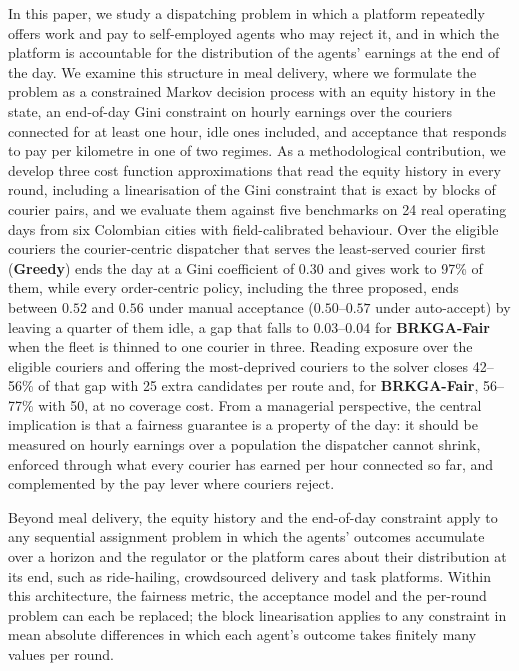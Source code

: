 \documentclass[a4paper,11pt,review,3p,authoryear]{elsarticle}
\begin{document}
In this paper, we study a dispatching problem in which a platform repeatedly offers work and pay to self-employed agents who may reject it, and in which the platform is accountable for the distribution of the agents' earnings at the end of the day. We examine this structure in meal delivery, where we formulate the problem as a constrained Markov decision process with an equity history in the state, an end-of-day Gini constraint on hourly earnings over the couriers connected for at least one hour, idle ones included, and acceptance that responds to pay per kilometre in one of two regimes. As a methodological contribution, we develop three cost function approximations that read the equity history in every round, including a linearisation of the Gini constraint that is exact by blocks of courier pairs, and we evaluate them against five benchmarks on 24 real operating days from six Colombian cities with field-calibrated behaviour. Over the eligible couriers the courier-centric dispatcher that serves the least-served courier first (\textbf{Greedy}) ends the day at a Gini coefficient of $0.30$ and gives work to 97\% of them, while every order-centric policy, including the three proposed, ends between $0.52$ and $0.56$ under manual acceptance ($0.50$--$0.57$ under auto-accept) by leaving a quarter of them idle, a gap that falls to $0.03$--$0.04$ for \textbf{BRKGA-Fair} when the fleet is thinned to one courier in three. Reading exposure over the eligible couriers and offering the most-deprived couriers to the solver closes 42--56\% of that gap with 25 extra candidates per route and, for \textbf{BRKGA-Fair}, 56--77\% with 50, at no coverage cost. From a managerial perspective, the central implication is that a fairness guarantee is a property of the day: it should be measured on hourly earnings over a population the dispatcher cannot shrink, enforced through what every courier has earned per hour connected so far, and complemented by the pay lever where couriers reject.

Beyond meal delivery, the equity history and the end-of-day constraint apply to any sequential assignment problem in which the agents' outcomes accumulate over a horizon and the regulator or the platform cares about their distribution at its end, such as ride-hailing, crowdsourced delivery and task platforms. Within this architecture, the fairness metric, the acceptance model and the per-round problem can each be replaced; the block linearisation applies to any constraint in mean absolute differences in which each agent's outcome takes finitely many values per round.
\end{document}
